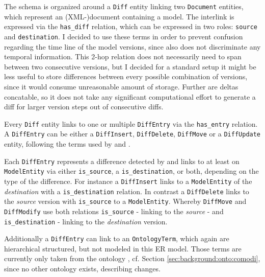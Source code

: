 
The schema is organized around a \texttt{Diff} entity linking two \texttt{Document} entities, which represent an (XML-)document containing a model. The interlink is expressed via the \texttt{has\_diff} relation, which can be expressed in two roles: \texttt{source} and \texttt{destination}. I decided to use these terms in order to prevent confusion regarding the time line of the model versions, since \bives also does not discriminate any temporal information.
This 2-hop relation does not necessarily need to span between two consecutive versions, but I decided for a standard setup it might be less useful to store differences between every possible combination of versions, since it would consume unreasonable amount of storage. Further are deltas concatable, so it does not take any significant computational effort to generate a diff for larger version steps out of consecutive diffs.

Every \texttt{Diff} entity links to one or multiple \texttt{DiffEntry} via the \texttt{has\_entry} relation.  
A \texttt{DiffEntry} can be either a \texttt{DiffInsert},  \texttt{DiffDelete}, \texttt{DiffMove} or a \texttt{DiffUpdate} entity, following the terms used by \bives \cite{Scharm2015} and \comodi \cite{Scharm2016}.

Each \texttt{DiffEntry} represents a difference detected by \bives \cite{Scharm2015} and links to at least on \texttt{ModelEntity} via either \texttt{is\_source}, a \texttt{is\_destination}, or both, depending on the type of the difference.
For instance a \texttt{DiffInsert} links to a \texttt{ModelEntity} of the \emph{destination} with a \texttt{is\_destination} relation.
In contrast a \texttt{DiffDelete} links to the \emph{source} version with \texttt{is\_source} to a \texttt{ModelEntity}. Whereby \texttt{DiffMove} and \texttt{DiffModify} use both relations \texttt{is\_source} - linking to the \emph{source} - and \texttt{is\_destination} - linking to the \emph{destination} version.

Additionally a \texttt{DiffEntry} can link to an \texttt{OntologyTerm}, which again are hierarchical structured, but not modeled in this ER model. Those terms are currently only taken from the \comodi ontology \cite{Scharm2016}, cf. Section \ref{sec:background:onto:comodi}, since no other ontology exists, describing changes.

